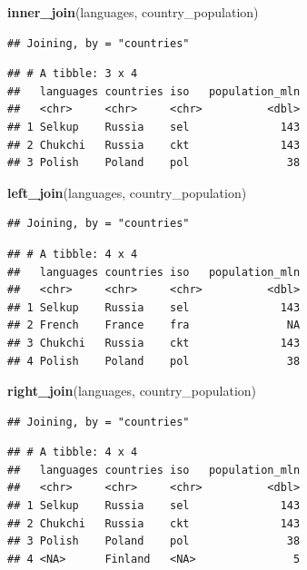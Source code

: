 \documentclass[]{book}
\newenvironment{Shaded}{\begin{snugshade}}{\end{snugshade}}
\newcommand{\KeywordTok}[1]{\textcolor[rgb]{0.13,0.29,0.53}{\textbf{#1}}}
\newcommand{\NormalTok}[1]{#1}
\begin{document}
\begin{Shaded}
\begin{Highlighting}[]
\KeywordTok{inner_join}\NormalTok{(languages, country_population)}
\end{Highlighting}
\end{Shaded}

\begin{verbatim}
## Joining, by = "countries"
\end{verbatim}

\begin{verbatim}
## # A tibble: 3 x 4
##   languages countries iso   population_mln
##   <chr>     <chr>     <chr>          <dbl>
## 1 Selkup    Russia    sel              143
## 2 Chukchi   Russia    ckt              143
## 3 Polish    Poland    pol               38
\end{verbatim}

\begin{Shaded}
\begin{Highlighting}[]
\KeywordTok{left_join}\NormalTok{(languages, country_population)}
\end{Highlighting}
\end{Shaded}

\begin{verbatim}
## Joining, by = "countries"
\end{verbatim}

\begin{verbatim}
## # A tibble: 4 x 4
##   languages countries iso   population_mln
##   <chr>     <chr>     <chr>          <dbl>
## 1 Selkup    Russia    sel              143
## 2 French    France    fra               NA
## 3 Chukchi   Russia    ckt              143
## 4 Polish    Poland    pol               38
\end{verbatim}

\begin{Shaded}
\begin{Highlighting}[]
\KeywordTok{right_join}\NormalTok{(languages, country_population)}
\end{Highlighting}
\end{Shaded}

\begin{verbatim}
## Joining, by = "countries"
\end{verbatim}

\begin{verbatim}
## # A tibble: 4 x 4
##   languages countries iso   population_mln
##   <chr>     <chr>     <chr>          <dbl>
## 1 Selkup    Russia    sel              143
## 2 Chukchi   Russia    ckt              143
## 3 Polish    Poland    pol               38
## 4 <NA>      Finland   <NA>               5
\end{verbatim}
\end{document}
